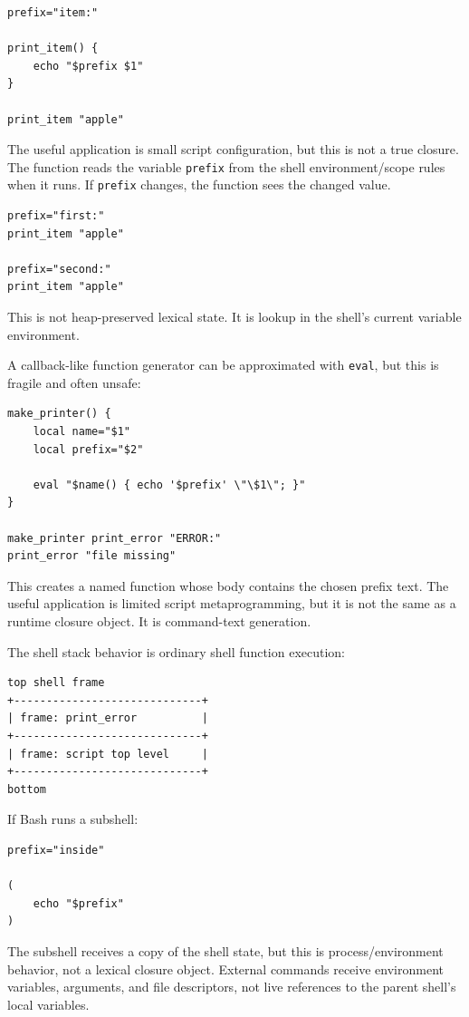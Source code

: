 \begin{verbatim}
prefix="item:"

print_item() {
    echo "$prefix $1"
}

print_item "apple"
\end{verbatim}

The useful application is small script configuration, but this is not a true closure. The function reads the variable \texttt{prefix} from the shell environment/scope rules when it runs. If \texttt{prefix} changes, the function sees the changed value.

\begin{verbatim}
prefix="first:"
print_item "apple"

prefix="second:"
print_item "apple"
\end{verbatim}

This is not heap-preserved lexical state. It is lookup in the shell's current variable environment.

A callback-like function generator can be approximated with \texttt{eval}, but this is fragile and often unsafe:

\begin{verbatim}
make_printer() {
    local name="$1"
    local prefix="$2"

    eval "$name() { echo '$prefix' \"\$1\"; }"
}

make_printer print_error "ERROR:"
print_error "file missing"
\end{verbatim}

This creates a named function whose body contains the chosen prefix text. The useful application is limited script metaprogramming, but it is not the same as a runtime closure object. It is command-text generation.

The shell stack behavior is ordinary shell function execution:

\begin{verbatim}
top shell frame
+-----------------------------+
| frame: print_error          |
+-----------------------------+
| frame: script top level     |
+-----------------------------+
bottom
\end{verbatim}

If Bash runs a subshell:

\begin{verbatim}
prefix="inside"

(
    echo "$prefix"
)
\end{verbatim}

The subshell receives a copy of the shell state, but this is process/environment behavior, not a lexical closure object. External commands receive environment variables, arguments, and file descriptors, not live references to the parent shell's local variables.

